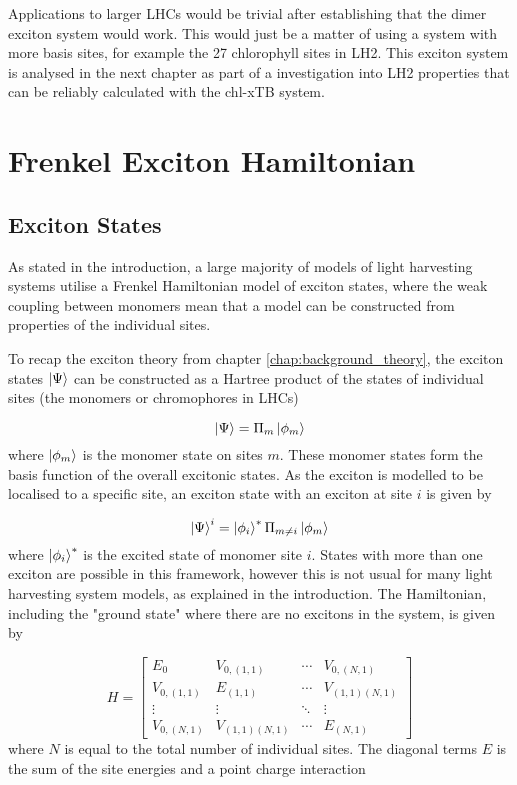 Applications to larger LHCs would be trivial after establishing that the dimer exciton
system would work. This would just be a matter of using a system with more basis
sites, for example the 27 chlorophyll sites in LH2. This exciton system is analysed
in the next chapter as part of a investigation into LH2 properties that can be reliably
calculated with the chl-xTB system.

\section{Frenkel Exciton Hamiltonian}
\label{sec:exciton_theory}

\subsection{Exciton States}
\label{subsec:exciton_states}
As stated in the introduction, a large majority of models of light harvesting systems
utilise a Frenkel Hamiltonian model of exciton states, where the weak coupling between
monomers mean that a model can be constructed from properties of the individual
sites.

To recap the exciton theory from chapter \ref{chap:background_theory}, the exciton 
states $\ket{\Psi}$ can be constructed as a Hartree product of the states of individual 
sites (the monomers or chromophores in LHCs)

\begin{equation}
    \ket{\Psi} = \Pi_m \ket{\phi_m}
\end{equation}
%
where $\ket{\phi_m}$ is the monomer state on sites $m$. These monomer states form
the basis function of the overall excitonic states. As the exciton is modelled to
be localised to a specific site, an exciton state with an exciton at site $i$ is
given by

\begin{equation}
    \ket{\Psi}^i = \ket{\phi_i}^\ast \Pi_{m \neq i}  \ket{\phi_m}
\end{equation}
%
where $\ket{\phi_i}^\ast$ is the excited state of monomer site $i$. States with 
more than one exciton are possible in this framework, however this is not usual 
for many light harvesting system models, as explained in the introduction. The Hamiltonian, 
including the "ground state" where there are no excitons in the system, is given 
by

\begin{equation}
    H = 
    \begin{bmatrix}
        E_0 & V_{0, \left(1, 1\right)} & \cdots & V_{0, \left(N, 1\right)} \\
        V_{0, \left(1, 1\right)} & E_{\left(1,1\right)} & \cdots & V_{\left(1,1\right) \left(N, 1\right)} \\
        \vdots & \vdots & \ddots & \vdots \\
        V_{0, \left(N, 1\right)} & V_{\left(1,1\right) \left(N, 1\right)} & \cdots & E_{\left(N, 1\right)}
    \end{bmatrix}
\end{equation}
%
where $N$ is equal to the total number of individual sites. The diagonal terms $E$
is the sum of the site energies and a point charge interaction

